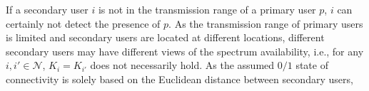 \documentclass[10pt,journal,compsoc]{IEEEtran}
\theoremstyle{mytheoremstyle}
\theoremstyle{mytheoremstyle}
\theoremstyle{mytheoremstyle}
\begin{document}

%
If a secondary user $i$ is not in the transmission range of a primary user $p$, $i$ can certainly not detect the presence of $p$.
As the transmission range of primary users is limited and secondary users are located at different locations, different secondary users may have different views of the spectrum availability, i.e., for any $i, i' \in \mathcal{N}$, $K_i = K_{i'}$ does not necessarily hold.	
%
As the assumed $0/1$ state of connectivity is solely based on the Euclidean distance between secondary users,
\end{document}
